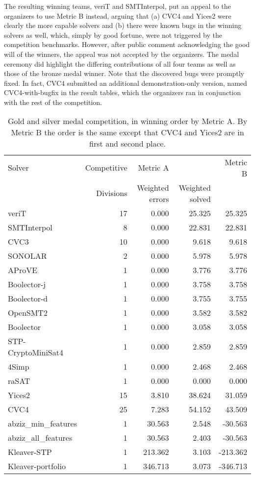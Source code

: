 \documentclass[twosize,11pt]{article}
\begin{document}
The resulting winning teams, veriT and SMTInterpol, put an appeal to the organizers to use Metric B instead, arguing that (a) CVC4 and Yices2 were clearly the more capable solvers and (b) there were known bugs in the winning solvers as well, which, simply by good fortune, were not triggered by the competition benchmarks. However, after public comment acknowledging the good will of the winners, the appeal was not accepted by the organizers. The medal ceremony did highlight the differing contributions of all four teams as well as those of the bronze medal winner. Note that the discovered bugs were promptly fixed. In fact, CVC4 submitted an additional demonstration-only version, named CVC4-with-bugfix in the result tables, which the organizers ran in conjunction with the rest of the competition.

\begin{table}
\centering
\begin{tabular}{|l|r|rr|r|}
\hline
Solver  & Competitive & Metric A & & Metric B \\
 & Divisions & Weighted errors & Weighted solved & \\
\hline
veriT & 17 &	0.000 	& 	25.325 & 25.325 \\
SMTInterpol & 8 &	0.000 	& 	22.831 & 22.831 \\
CVC3 & 10	& 	0.000 	& 	9.618 & 9.618 \\
SONOLAR 	& 2	&  	0.000 	& 	5.978 & 	5.978\\
AProVE 		& 1 & 	0.000 	& 	3.776	& 	3.776\\
Boolector-j & 1	&  	0.000 	& 	3.758	& 	3.758\\
Boolector-d & 1		&  	0.000 	& 	3.755 & 	3.755\\
OpenSMT2 	& 1	&  	0.000 &	3.582 &	3.582\\
Boolector & 1		&  	0.000 &	3.058  &	3.058 \\
STP-CryptoMiniSat4 	& 1	&  	0.000 &	2.859 &	2.859\\
4Simp 	& 1	& 	0.000 	& 	2.468  	& 	2.468 \\
raSAT 	& 1	& 	0.000 	& 	0.000 	& 	0.000 \\
Yices2 	& 15	&  	3.810 	& 	38.624 & 31.059 \\
CVC4 		& 25 &  	7.283 	& 	54.152 & 43.509 \\
abziz\_min\_features 	& 1	& 	30.563 	& 	2.548 & -30.563 \\
abziz\_all\_features 	& 1	&  	30.563 	& 	2.403 & -30.563 \\
Kleaver-STP 	& 1	&  	213.362 	& 	3.103 & -213.362 \\
Kleaver-portfolio & 1		&  	346.713 	& 	3.073  & -346.713 \\
\hline
\end{tabular}
\vspace{.2in}
\caption{Gold and silver medal competition, in winning order by Metric A. By Metric B the order is the same except that CVC4 and Yices2 are in first and second place.}
\label{Table:medals}
\end{table}
\end{document}
